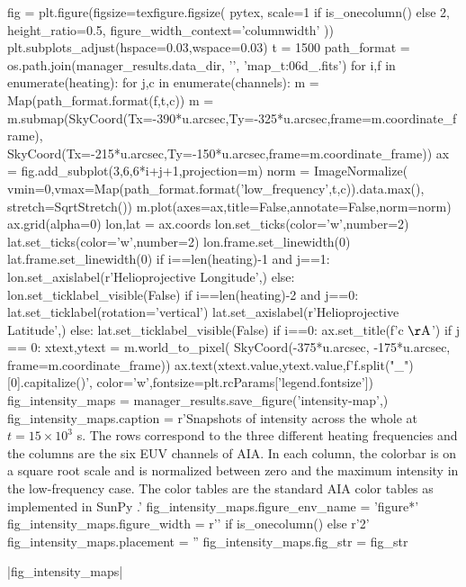 \begin{pycode}
fig = plt.figure(figsize=texfigure.figsize(
    pytex,
    scale=1 if is_onecolumn() else 2,
    height_ratio=0.5, 
    figure_width_context='columnwidth'
))
plt.subplots_adjust(hspace=0.03,wspace=0.03)
t = 1500
path_format = os.path.join(manager_results.data_dir, '{}', 'map_t{:06d}_{}.fits')
for i,f in enumerate(heating):
    for j,c in enumerate(channels):
        m = Map(path_format.format(f,t,c))
        m = m.submap(SkyCoord(Tx=-390*u.arcsec,Ty=-325*u.arcsec,frame=m.coordinate_frame),
                     SkyCoord(Tx=-215*u.arcsec,Ty=-150*u.arcsec,frame=m.coordinate_frame))
        ax = fig.add_subplot(3,6,6*i+j+1,projection=m)
        norm = ImageNormalize(
            vmin=0,vmax=Map(path_format.format('low_frequency',t,c)).data.max(),
            stretch=SqrtStretch())
        m.plot(axes=ax,title=False,annotate=False,norm=norm)
        ax.grid(alpha=0)
        lon,lat = ax.coords
        lon.set_ticks(color='w',number=2)
        lat.set_ticks(color='w',number=2)
        lon.frame.set_linewidth(0)
        lat.frame.set_linewidth(0)
        if i==len(heating)-1 and j==1:
            lon.set_axislabel(r'Helioprojective Longitude',)
        else:
            lon.set_ticklabel_visible(False)
        if i==len(heating)-2 and j==0:
            lat.set_ticklabel(rotation='vertical')
            lat.set_axislabel(r'Helioprojective Latitude',)
        else:
            lat.set_ticklabel_visible(False)
        if i==0:
            ax.set_title(f'{c} $\mathrm{{\AA}}$')
        if j == 0:
            xtext,ytext = m.world_to_pixel(
                SkyCoord(-375*u.arcsec, -175*u.arcsec, frame=m.coordinate_frame))
            ax.text(xtext.value,ytext.value,f'{f.split("_")[0].capitalize()}',
                    color='w',fontsize=plt.rcParams['legend.fontsize'])
fig_intensity_maps = manager_results.save_figure('intensity-map',)
fig_intensity_maps.caption = r'Snapshots of intensity across the whole \AR{} at $t=15\times10^3$ s. The rows correspond to the three different heating frequencies and the columns are the six EUV channels of AIA. In each column, the colorbar is on a square root scale and is normalized between zero and the maximum intensity in the low-frequency case. The color tables are the standard AIA color tables as implemented in SunPy \citep{sunpy_community_sunpypython_2015}.'
fig_intensity_maps.figure_env_name = 'figure*'
fig_intensity_maps.figure_width = r'\columnwidth' if is_onecolumn() else r'2\columnwidth'
fig_intensity_maps.placement = ''
fig_intensity_maps.fig_str = fig_str
\end{pycode}
|fig_intensity_maps|

